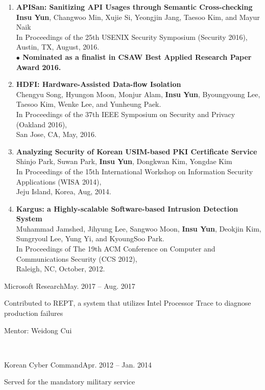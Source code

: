\documentclass[11pt,letterpaper]{article}
\begin{document}
\begin{enumerate}
{  }
  \item \textbf{APISan: Sanitizing API Usages through Semantic Cross-checking} \\
  {\footnotesize
     \textbf{Insu Yun}, Changwoo Min, Xujie Si, Yeongjin Jang, Taesoo Kim, and Mayur Naik \\
     In Proceedings of the 25th USENIX Security Symposium (Security 2016), \\
     Austin, TX, August, 2016. \\
     \textbf{$\bullet$ Nominated as a finalist in CSAW Best Applied Research Paper Award 2016.}
  }
  \item \textbf{HDFI: Hardware-Assisted Data-flow Isolation} \\
  {\footnotesize
    Chengyu Song, Hyungon Moon, Monjur Alam, \textbf{Insu Yun}, Byoungyoung Lee,
    Taesoo Kim, Wenke Lee, and Yunheung Paek. \\
    In Proceedings of the 37th IEEE Symposium on Security and Privacy (Oakland 2016), \\
    San Jose, CA, May, 2016.
  }
  \item \textbf{Analyzing Security of Korean USIM-based PKI Certificate Service} \\
  {\footnotesize
    Shinjo Park, Suwan Park, \textbf{Insu Yun}, Dongkwan Kim, Yongdae Kim \\
    In Proceedings of the 15th International Workshop on Information Security Applications (WISA 2014), \\
    Jeju Island, Korea, Aug, 2014.
  }
  \item \textbf{Kargus: a Highly-scalable Software-based Intrusion Detection System} \\
  {\footnotesize
    Muhammad Jamshed, Jihyung Lee, Sangwoo Moon, \textbf{Insu Yun}, Deokjin
    Kim, Sungryoul Lee, Yung Yi, and KyoungSoo Park. \\
    In Proceedings of The 19th ACM Conference on Computer and Communications Security (CCS 2012), \\
    Raleigh, NC, October, 2012.
  }
\end{enumerate}

%
%

\begin{envtime}{Microsoft Research}{May. 2017 -- Aug. 2017}
\item Contributed to REPT, a system that utilizes Intel Processor Trace to diagnose production failures
  \item Mentor:  Weidong Cui
\end{envtime}
 \\
\begin{envtime}{Korean Cyber Command}{Apr. 2012 -- Jan. 2014}
  \item Served for the mandatory military service
\end{envtime}
\end{document}
